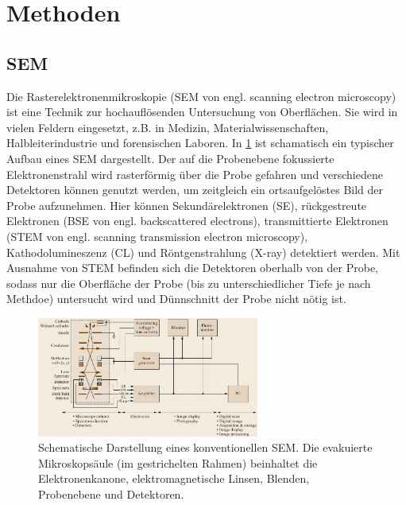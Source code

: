 \section{Methoden}


\subsection{SEM}

Die Rasterelektronenmikroskopie (SEM von engl. scanning electron microscopy) ist eine Technik zur hochauflösenden Untersuchung von Oberflächen.
Sie wird in vielen Feldern eingesetzt, z.B. in Medizin, Materialwissenschaften, Halbleiterindustrie und forensischen Laboren.
In \cref{fig:sem_schematic} ist schamatisch ein typischer Aufbau eines SEM dargestellt.
Der auf die Probenebene fokussierte Elektronenstrahl wird rasterförmig über die Probe gefahren und verschiedene Detektoren können genutzt werden, um zeitgleich ein ortsaufgelöstes Bild der Probe aufzunehmen.
Hier können Sekundärelektronen (SE), rückgestreute Elektronen (BSE von engl. backscattered electrons), transmittierte Elektronen (STEM von engl. scanning transmission electron microscopy), Kathodolumineszenz (CL) und Röntgenstrahlung (X-ray) detektiert werden. %
Mit Ausnahme von STEM befinden sich die Detektoren oberhalb von der Probe, sodass nur die Oberfläche der Probe (bis zu unterschiedlicher Tiefe je nach Methdoe) untersucht wird und Dünnschnitt der Probe nicht nötig ist.

\begin{figure}[!ht]
    \centering
    \includegraphics[width=0.65\textwidth]{img/sem_schematic}
    \caption{
    Schematische Darstellung eines konventionellen SEM.
    Die evakuierte Mikroskopsäule (im gestrichelten Rahmen) beinhaltet die Elektronenkanone, elektromagnetische Linsen, Blenden, Probenebene und Detektoren. \cite{springer-handbook}
    }
    \label{fig:sem_schematic}
\end{figure}

